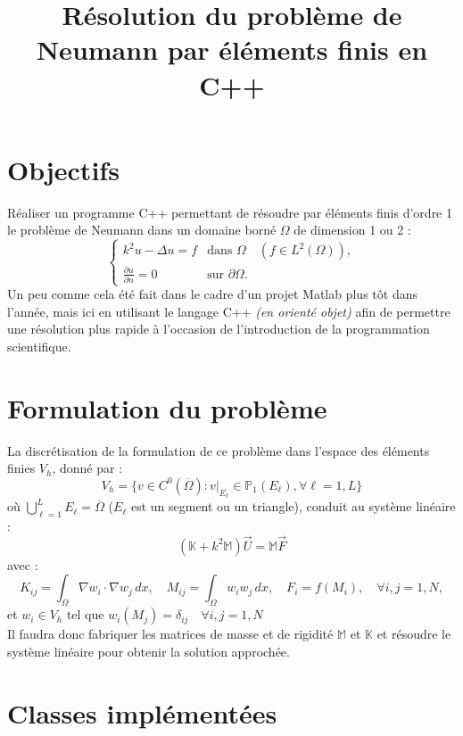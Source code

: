 \documentclass{article}
\title{Résolution du problème de Neumann par éléments finis en C++}
\date{}
\author{}
\begin{document}
\maketitle

\section*{Objectifs}
    Réaliser un programme C++ permettant de résoudre par éléments finis d'ordre 1 le problème de Neumann dans un domaine borné \(\Omega\) de dimension 1 ou 2 :
    \[
    \begin{cases}
    k^2 u - \Delta u = f & \text{dans } \Omega \quad (f \in L^2(\Omega)), \\
    \frac{\partial u}{\partial n} = 0 & \text{sur } \partial\Omega.
    \end{cases}
    \]
    Un peu comme cela été fait dans le cadre d'un projet Matlab plus tôt dans l'année, mais ici en utilisant le langage C++ \textit{(en orienté objet)} afin de permettre une résolution plus rapide
    à l'occasion de l'introduction de la programmation scientifique.


\section*{Formulation du problème}
    La discrétisation de la formulation de ce problème dans l'espace des éléments finies \(V_h\), donné par :
    \[
    V_h = \{v \in C^0(\overline{\Omega}) : v|_{E_\ell} \in \mathbb{P}_1(E_\ell), \forall \ell = 1, L\}
    \]
    où \(\bigcup\limits_{\ell=1}^L E_\ell = \overline{\Omega}\) (\(E_\ell\) est un segment ou un triangle), conduit au syst\`eme linéaire :
    \[
    (\mathbb{K} + k^2 \mathbb{M}) \vec{U} = \mathbb{M} \vec{F}
    \]
    avec :
    \[
    K_{ij} = \int_{\Omega} \nabla w_i \cdot \nabla w_j \, dx, \quad M_{ij} = \int_{\Omega} w_i w_j \, dx, \quad F_i = f(M_i), \quad \forall i, j = 1, N,
    \]
    et \(w_i \in V_h\) tel que \(w_i(M_j) = \delta_{ij} \quad \forall i, j = 1, N\) \\
    Il faudra donc fabriquer les matrices de masse et de rigidité \(\mathbb{M}\) et \(\mathbb{K}\) et résoudre le système linéaire pour obtenir la solution approchée.


\section{Classes implémentées}
\end{document}
